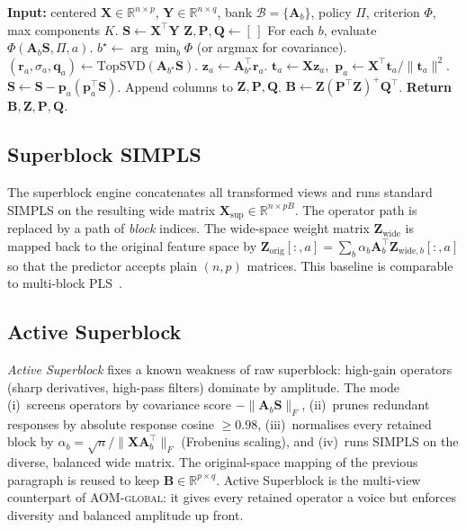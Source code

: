 \documentclass[review,a4paper]{elsarticle}
\newcommand{\R}{\mathbb{R}}
\newcommand{\Xmat}{\mathbf{X}}
\newcommand{\Ymat}{\mathbf{Y}}
\newcommand{\Pmat}{\mathbf{P}}
\newcommand{\Qmat}{\mathbf{Q}}
\newcommand{\Bmat}{\mathbf{B}}
\newcommand{\Amat}{\mathbf{A}}
\newcommand{\Smat}{\mathbf{S}}
\newcommand{\Zmat}{\mathbf{Z}}
\newcommand{\zvec}{\mathbf{z}}
\newcommand{\rvec}{\mathbf{r}}
\newcommand{\tvec}{\mathbf{t}}
\newcommand{\pvec}{\mathbf{p}}
\newcommand{\qvec}{\mathbf{q}}
\newcommand{\AOM}{\textsc{AOM}\xspace}
\newcommand{\PLS}{\textsc{PLS}\xspace}
\newcommand{\SIMPLS}{\textsc{SIMPLS}\xspace}
\begin{document}
\begin{algorithm}[t]
\caption{\SIMPLS in covariance space with operator selection.}
\label{alg:simpls-cov}
\begin{algorithmic}[1]
\State \textbf{Input:} centered $\Xmat\in\R^{n\times p}$,
$\Ymat\in\R^{n\times q}$, bank $\mathcal{B}=\{\Amat_b\}$,
policy $\Pi$, criterion $\Phi$, max components $K$.
\State $\Smat\gets \Xmat^\top \Ymat$
\State $\Zmat,\Pmat,\Qmat\gets [\,]$
  \State For each $b$, evaluate $\Phi(\Amat_b\Smat,\Pi,a)$.
  \State $b^\star\gets \arg\min_b \Phi$ (or argmax for covariance).
  \State $(\rvec_a,\sigma_a,\qvec_a)\gets \mathrm{TopSVD}(\Amat_{b^\star}\Smat)$.
  \State $\zvec_a\gets \Amat_{b^\star}^\top \rvec_a$.
  \State $\tvec_a\gets \Xmat \zvec_a$,~$\pvec_a\gets
        \Xmat^\top \tvec_a/\|\tvec_a\|^2$.
  \State $\Smat\gets \Smat - \pvec_a(\pvec_a^\top\Smat)$.
  \State Append columns to $\Zmat,\Pmat,\Qmat$.
\EndFor
\State $\Bmat\gets \Zmat(\Pmat^\top\Zmat)^{+}\Qmat^\top$.
\State \textbf{Return} $\Bmat,\Zmat,\Pmat,\Qmat$.
\end{algorithmic}
\end{algorithm}

\subsection{Superblock SIMPLS}
\label{sec:algo-superblock}
The superblock engine concatenates all transformed views and runs
standard \SIMPLS on the resulting wide matrix
$\Xmat_{\mathrm{sup}}\in\R^{n\times pB}$. The operator path is replaced
by a path of \emph{block} indices. The wide-space weight matrix
$\Zmat_{\mathrm{wide}}$ is mapped back to the original feature space by
$\Zmat_{\mathrm{orig}}[:,a] = \sum_b \alpha_b \Amat_b^\top
\Zmat_{\mathrm{wide},b}[:,a]$ so that the predictor accepts plain
$(n,p)$ matrices. This baseline is comparable to multi-block
\PLS~\cite{westerhuis1998analysis}.

\subsection{Active Superblock}
\label{sec:algo-active-superblock}
\emph{Active Superblock} fixes a known weakness of raw superblock: high-gain
operators (sharp derivatives, high-pass filters) dominate by amplitude.
The mode (i)~screens operators by covariance score $-\|\Amat_b\Smat\|_F$,
(ii)~prunes redundant responses by absolute response cosine
$\geq 0.98$, (iii)~normalises every retained block by
$\alpha_b=\sqrt{n}/\|\Xmat \Amat_b^\top\|_F$ (Frobenius scaling), and
(iv)~runs \SIMPLS on the diverse, balanced wide matrix. The original-space
mapping of the previous paragraph is reused to keep
$\Bmat\in\R^{p\times q}$. Active Superblock is the multi-view
counterpart of \AOM-\textsc{global}: it gives every retained operator a
voice but enforces diversity and balanced amplitude up front.
\end{document}
